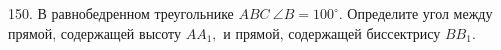 150. В равнобедренном треугольнике $ABC\ \angle B = 100^\circ.$ Определите угол между прямой, содержащей высоту $AA_1,$ и прямой, содержащей биссектрису $BB_1.$\\
